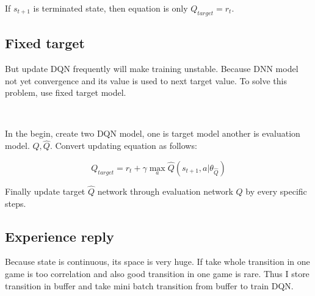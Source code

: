 \documentclass[12pt]{article}
\begin{document}
If $s_{t+1}$ is terminated state, then equation is only $Q_{target} = r_t$.

\subsection{Fixed target}

But update DQN frequently will make training unstable. Because DNN model not yet convergence and its value is used to next target value. To solve this problem, use fixed target model.
\par \ \par
In the begin, create two DQN model, one is target model another is evaluation model. $Q, \hat{Q}$. Convert updating equation as follows:

\begin{equation}
   Q_{target} =  r_t + \gamma \max_a \hat{Q}(s_{t+1}, a | \theta_{\hat{Q}} )
\end{equation}

Finally update target $\hat{Q}$ network through evaluation network $Q$ by every specific steps.

\subsection{Experience reply}

Because state is continuous, its space is very huge. If take whole transition in one game is too correlation and also good transition in one game is rare. Thus I store transition in buffer and take mini batch transition from buffer to train DQN.
\end{document}
